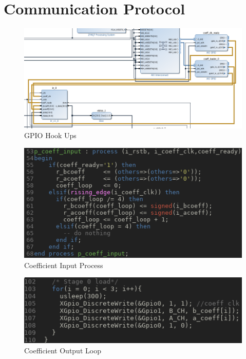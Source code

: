 \documentclass[12pt,a4paper,titlepage]{article}
\begin{document}
\section{Communication Protocol}
\begin{figure}[!htb]
  \centering
  \includegraphics[width=\textwidth]
                  {../presentation/zynq-communication-design.png}
                  \caption{GPIO Hook Ups}
                  \label{fig:b0}
\end{figure}
\begin{figure}[!htb]
  \centering
  \includegraphics[width=\textwidth]
                  {../presentation/coeff.png}
                  \caption{Coefficient Input Process}
                  \label{fig:b1}
\end{figure}
\begin{figure}[!htb]
  \centering
  \includegraphics[width=\textwidth]
                  {../presentation/zynq-coeff.png}
                  \caption{Coefficient Output Loop}
                  \label{fig:b2}
\end{figure}
\end{document}
